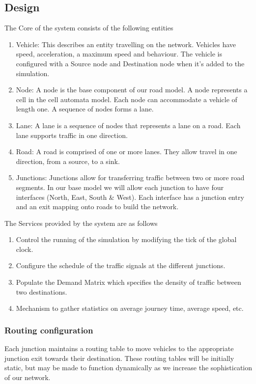 	\subsection{Design}
		\label{secarch}
	The Core of the system consists of the following entities
	\begin{enumerate}
		\item Vehicle: This describes an entity travelling on the network. Vehicles have speed, acceleration, a maximum speed and behaviour. The vehicle is configured with a Source node and Destination node when it's added to the simulation. 
		
		\item Node: A node is the base component of our road model. A node represents a cell in the cell automata model. Each node can accommodate a vehicle of length one. A sequence of nodes forms a lane.
		
		\item Lane: A lane is a sequence of nodes that represents a lane on a road. Each lane supports traffic in one direction.
		
		\item Road: A road is comprised of one or more lanes. They allow travel in one direction, from a source, to a sink.
		
		\item Junctions: Junctions allow for transferring traffic between two or more road segments. In our base model we will allow each junction to have four interfaces (North, East, South \& West). Each interface has a junction entry and an exit mapping onto roads to build the network.
	\end{enumerate}
	The Services provided by the system are as follows
	\begin{enumerate}
		\item Control the running of the simulation by modifying the tick of the global clock.
		
		\item Configure the schedule of the traffic signals at the different junctions.
		
		\item Populate the Demand Matrix which specifies the density of traffic between two destinations.
		
		\item Mechanism to gather statistics on average journey time, average speed, etc.
	\end{enumerate}
	
	\subsubsection{Routing configuration}
		Each junction maintains a routing table to move vehicles to the appropriate junction exit towards their destination. These routing tables will be initially static, but may be made to function dynamically as we increase the sophistication of our network.
		
